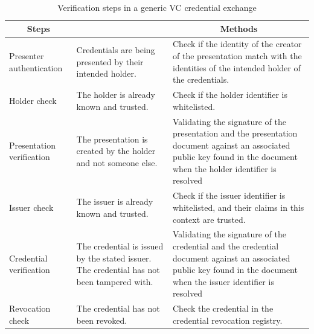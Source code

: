 \begin{table}
\caption{Verification steps in a generic \acrshort{VC} credential exchange}
\label{tab:verification-steps}
\begin{tabular}{m{10em} | m{10em} | m{18em} }
\multicolumn{1}{c}{\textbf{Steps}} & \multicolumn{1}{c}{\textbf{}} & \multicolumn{1}{c}{\textbf{Methods}} \\ 
\hline
Presenter authentication & Credentials are being presented by their intended holder. & Check if the identity of the creator of the presentation match with the identities of the intended holder of the credentials. \\ 
\hline
Holder check & The holder is already known and trusted. & Check if the holder identifier is whitelisted. \\ 
\hline
Presentation verification & The presentation is created by the holder and not someone else. & Validating the signature of the presentation and the presentation document against an associated public key found in the document when the holder identifier is resolved \\ 
\hline
Issuer check & The issuer is already known and trusted. & Check if the issuer identifier is whitelisted, and their claims in this context are trusted. \\ 
\hline
Credential verification & The credential is issued by the stated issuer. The credential has not been tampered with. & Validating the signature of the credential and the credential document against an associated public key found in the document when the issuer identifier is resolved \\ 
\hline
Revocation check & The credential has not been revoked. & Check the credential in the credential revocation registry. \\ 
\end{tabular}
\end{table}

